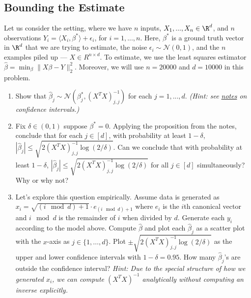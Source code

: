 \documentclass{article}
\begin{document}
\subsection*{Bounding the Estimate} 
\begin{bprob}
    Let us consider the setting, where we have $n$ inputs, $X_1, ..., X_n \in \R^d$, and $n$ observations $Y_i = \langle X_i, \beta^* \rangle + \epsilon_i$, for $i = 1, ..., n$. Here, $\beta^*$ is a ground truth vector in $\R^d$ that we are trying to estimate, the noise $\epsilon_i \sim \mathcal{N}(0, 1)$, and the $n$ examples piled up --- $X \in R^{n\times d}$. To estimate, we use the least squares estimator $\widehat{\beta} = \min_\beta \lVert X\beta - Y\rVert_2^2$. Moreover, we will use $n=20000$ and $d=10000$ in this problem.

    \begin{enumerate}
        \item {} Show that $\widehat{\beta}_j \sim \mathcal{N}(\beta_j^*, (X^T X)^{-1}_{j, j})$ for each $j = 1, ..., d$. \emph{(Hint: see \href{https://courses.cs.washington.edu/courses/cse446/20au/schedule/notes_conf_intervals.pdf}{notes} on confidence intervals.)}
        \item {} Fix $\delta \in (0,1)$ suppose $\beta^* = 0$. Applying the proposition from the notes, conclude that for each $j \in [d]$, with probability at least $1-\delta$, $|\widehat{\beta}_j| \leq \sqrt{2(X^TX)^{-1}_{j, j} \log(2 / \delta)}$.
        Can we conclude that with probability at least $1-\delta$,  $|\widehat{\beta}_j| \leq \sqrt{2(X^TX)^{-1}_{j, j} \log(2 / \delta)}$ for all $j \in [d]$ simultaneously? Why or why not?
        \item {} Let's explore this question empirically. Assume data is generated as $x_i = \sqrt{(i \mod d) + 1} \cdot e_{(i \mod d) + 1}$ where $e_i$ is the $i$th canonical vector and $i \mod d$ is the remainder of $i$ when divided by $d$. Generate each $y_i$ according to the model above. 
        Compute $\widehat{\beta}$ and plot each $\widehat{\beta}_j$ as a scatter plot with the $x$-axis as $j \in \{1,\dots,d\}$. Plot $\pm \sqrt{2(X^TX)^{-1}_{j, j} \log(2 / \delta)}$ as the upper and lower confidence intervals with $1 - \delta = 0.95$. How many $\widehat{\beta}_j$'s are outside the confidence interval?  \emph{Hint: Due to the special structure of how we generated $x_i$, we can compute $(X^TX)^{-1}$ analytically without computing an inverse explicitly.}
   
    \end{enumerate}


\end{bprob}
\end{document}
